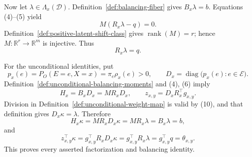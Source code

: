 Now let \(\lambda\in\Lambda_x(\mathcal D)\).  Definition~\ref{def:balancing-fiber} gives \(B_x\lambda=b\).  Equations (4)--(5) yield
\[
M(R_x\lambda-q)=0.
\tag{8}
\]
Definition~\ref{def:positive-latent-shift-class} gives \(\operatorname{rank}(M)=r\); hence \(M:\mathbb R^r\to\mathbb R^m\) is injective.  Thus
\[
R_x\lambda=q.
\tag{9}
\]

For the unconditional identities, put
\[
p_x(e)=P_O(E=e,X=x)=\pi_e\rho_x(e)>0,
\qquad
D_x=\operatorname{diag}\bigl(p_x(e):e\in\mathcal E\bigr).
\tag{10}
\]
Definition~\ref{def:unconditional-balancing-moments} and (4), (6) imply
\[
H_x=B_xD_x=MR_xD_x,
\qquad
z_{x,y}=D_xR_x^{\top}g_{x,y}.
\tag{11}
\]
Division in Definition~\ref{def:unconditional-weight-map} is valid by (10), and that definition gives \(D_x\kappa=\lambda\).  Therefore
\[
H_x\kappa=MR_xD_x\kappa=MR_x\lambda=B_x\lambda=b,
\tag{12}
\]
and
\[
z_{x,y}^{\top}\kappa
=g_{x,y}^{\top}R_xD_x\kappa
=g_{x,y}^{\top}R_x\lambda
=g_{x,y}^{\top}q
=\theta_{x,y}.
\tag{13}
\]
This proves every asserted factorization and balancing identity.